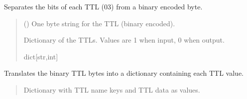 \documentclass[letterpaper,10pt,english]{sphinxmanual}
\begin{document}
\begin{fulllineitems}
\begin{fulllineitems}
\end{fulllineitems}


\begin{fulllineitems}
\label{\detokenize{Morelia.Packets:Morelia.Packets.Binary4.PacketBinary4.TranslateBinaryTTLbyte}}
\pysigstartsignatures
{}
\pysigstopsignatures
\sphinxAtStartPar
Separates the bits of each TTL (0\sphinxhyphen{}3) from a binary encoded byte.
\begin{quote}\begin{description}
\sphinxAtStartPar
{} () \textendash{} One byte string for the TTL (binary encoded).

\sphinxAtStartPar
Dictionary of the TTLs. Values are 1 when input, 0 when output.

\sphinxAtStartPar
dict{[}str,int{]}

\end{description}\end{quote}

\end{fulllineitems}


\begin{fulllineitems}
\label{\detokenize{Morelia.Packets:Morelia.Packets.Binary4.PacketBinary4.Ttl}}
\pysigstartsignatures
{}
\pysigstopsignatures
\sphinxAtStartPar
Translates the binary TTL bytes into a dictionary containing each TTL value.
\begin{quote}\begin{description}
\sphinxAtStartPar
Dictionary with TTL name keys and TTL data as values.


\end{description}
\end{quote}
\end{fulllineitems}
\end{fulllineitems}
\end{document}
